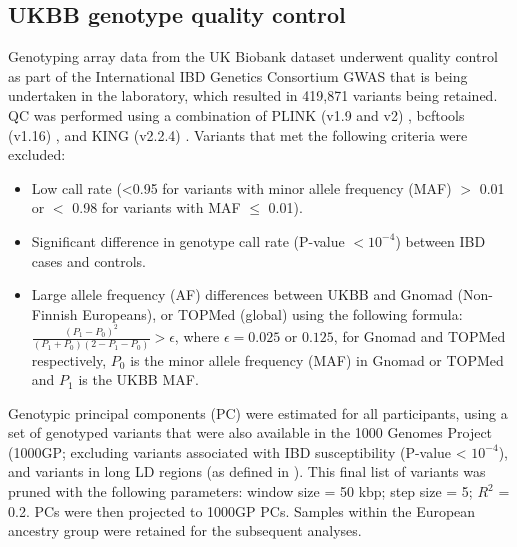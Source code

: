 \subsection{UKBB genotype quality control}
Genotyping array data from the UK Biobank dataset underwent quality control as part of the International IBD Genetics Consortium GWAS that is being undertaken in the laboratory, which resulted in 419,871 variants being retained. QC was performed using a combination of PLINK (v1.9 and v2) \cite{Purcell2007-mu}, bcftools (v1.16) \cite{Li2011-td}, and KING (v2.2.4) \cite{king-software}.  Variants that met the following criteria were excluded: 
\begin{itemize}
  \item Low call rate (<0.95 for variants with minor allele frequency (MAF) $>$ 0.01 or $<$ 0.98 for variants with MAF $\leq$ 0.01).
  \item Significant difference in genotype call rate (P-value $< 10^{-4}$) between IBD cases and controls.
  \item Large allele frequency (AF) differences between UKBB and Gnomad (Non-Finnish Europeans), or TOPMed (global) using the following formula: $\frac{(P_{1}-P_{0})^{2}}{(P_{1}+P_{0})(2-P_{1}-P_{0})} > \epsilon$, where $\epsilon=0.025$ or $0.125$, for Gnomad and TOPMed respectively,  $P_{0}$ is the minor allele frequency (MAF) in Gnomad or TOPMed and $P_{1}$ is the UKBB MAF. 
\end{itemize}

Genotypic principal components (PC) were estimated for all participants, using a set of genotyped variants that were also available in the 1000 Genomes Project (1000GP; excluding variants associated with IBD susceptibility (P-value < $10^{-4}$), and variants in long LD regions (as defined in \cite{plink_high_ld}). This final list of variants was pruned with the following parameters: window size = 50 kbp; step size = 5; $R^{2}$ = 0.2. PCs were then projected to 1000GP PCs. Samples within the European ancestry group were retained for the subsequent analyses. 



